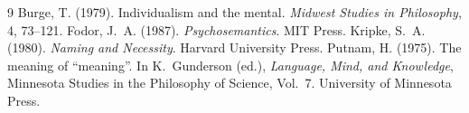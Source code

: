 \documentclass{situationist-preprint}
\begin{document}
\begin{thebibliography}{9}\small
{} Burge, T. (1979). Individualism and the mental. \emph{Midwest Studies in Philosophy}, 4, 73--121.
 Fodor, J.~A. (1987). \emph{Psychosemantics}. MIT Press.
 Kripke, S.~A. (1980). \emph{Naming and Necessity}. Harvard University Press.
 Putnam, H. (1975). The meaning of \enquote{meaning}. In K.~Gunderson (ed.), \emph{Language, Mind, and Knowledge}, Minnesota Studies in the Philosophy of Science, Vol.~7. University of Minnesota Press.
\end{thebibliography}
\end{document}
